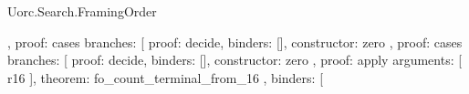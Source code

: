 \begin{lexlean}{Uorc.Search.FramingOrder}
\begin{semanticmodule}
{{{{{{{{{{{{{{{{{{{{{{{{{{{{{                                                                                    },
                                                                                    {
                                                                                      proof: cases{
                                                                                        branches: [
                                                                                          {
                                                                                            proof: decide{},
                                                                                            binders: [],
                                                                                            constructor: zero
                                                                                          },
                                                                                          {
                                                                                            proof: cases{
                                                                                              branches: [
                                                                                                {
                                                                                                  proof: decide{},
                                                                                                  binders: [],
                                                                                                  constructor: zero
                                                                                                },
                                                                                                {
                                                                                                  proof: apply{
                                                                                                    arguments: [
                                                                                                      r16
                                                                                                    ],
                                                                                                    theorem: fo_count_terminal_from_16
                                                                                                  },
                                                                                                  binders: [
}}}}}}}}}}}}}}}}}}}}}}}}}}}}}}}}}
\end{semanticmodule}
\end{lexlean}
